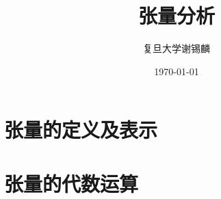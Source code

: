 \documentclass[oneside]{book}
\title{
	\vspace{-4 cm} \color{Sienna} \Huge 张量分析
}
\author{
	\CJKfamily{楷体} \color{DarkRed} \Large 复旦大学\phantom{空格}谢锡麟
}
\date{
	\CJKfamily{楷体} \color{Goldenrod} \Large \today
}
\theoremstyle{nonumberplain} %
\begin{document}
%	
%	
	\chapter{张量的定义及表示}
		
	
	\chapter{张量的代数运算}
		
%		
\end{document}
